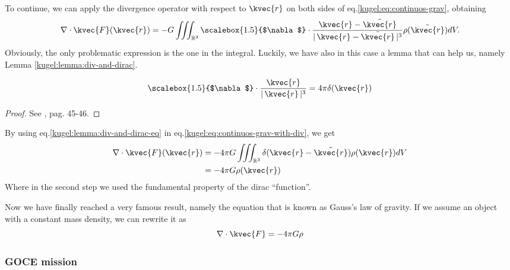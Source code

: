 To continue, we can apply the divergence operator with respect to $\kvec{r}$ on both sides of eq.\eqref{kugel:eq:continuos-grav}, obtaining 
\begin{equation}
  \nabla \cdot  \kvec{F}(\kvec{r}) = -G \iiint_{\mathbb{R}^3} \text{\scalebox{1.5}{$\nabla$}} \cdot \frac{\kvec{r}-\tilde{\kvec{r}}}{|\, \kvec{r}-\tilde{\kvec{r}} \,|^3} \rho(\tilde{\kvec{r}})dV. \label{kugel:eq:continuos-grav-with-div} 
\end{equation}
Obviously, the only problematic expression is the one in the integral. Luckily, we have also in this case a lemma that can help us, namely Lemma \ref{kugel:lemma:div-and-dirac}.
\begin{lemma}
  \label{kugel:lemma:div-and-dirac}
  \begin{equation}
    \text{\scalebox{1.5}{$\nabla$}} \cdot \frac{\kvec{r}}{|\,\kvec{r}\,|^3}=4\pi \delta(\kvec{r}) \label{kugel:lemma:div-and-dirac-eq}
  \end{equation}
\end{lemma}
\begin{proof}
  See \cite{proof-relation-divergence&dirac}, pag. 45-46.
\end{proof}
By using eq.\eqref{kugel:lemma:div-and-dirac-eq} in eq.\eqref{kugel:eq:continuos-grav-with-div}, we get
\begin{align*}
  \nabla \cdot \kvec{F}(\kvec{r}) &= -4\pi G \iiint_{\mathbb{R}^3} \delta(\kvec{r}-\tilde{\kvec{r}}) \rho(\kvec{r}) dV \\
                  &= -4\pi G \rho(\kvec{r})
\end{align*}
Where in the second step we used the fundamental property of the dirac ``function''.

Now we have finally reached a very famous result, namely the equation that is known as Gauss's law of gravity. 
If we assume an object with a constant mass density, we can rewrite it as
\begin{equation}
  \nabla \cdot \kvec{F} = -4\pi G \rho \label{kugel:eq:gauss-gravity}
\end{equation}

\subsubsection{GOCE mission}


